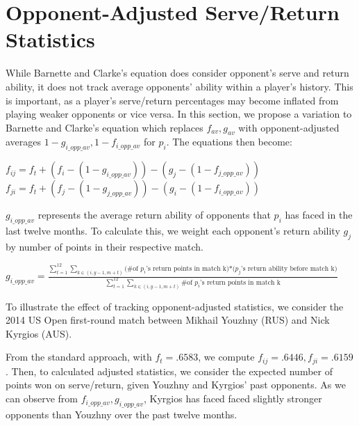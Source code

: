 \documentclass[chapterprefix=false]{report}
\begin{document}
\section{Opponent-Adjusted Serve/Return Statistics}

While Barnette and Clarke's equation does consider opponent's serve and return ability, it does not track average opponents' ability within a player's history. This is important, as a player's serve/return percentages may become inflated from playing weaker opponents or vice versa. In this section, we propose a variation to Barnette and Clarke's equation which replaces $f_{av},g_{av}$ with opponent-adjusted averages $1-g_{i\_opp\_av},1-f_{i\_opp\_av}$ for $p_i$. The equations then become:

\begin{center}
$f_{ij} = f_t + (f_i-(1-g_{i\_opp\_av}))-(g_j-(1-f_{j\_opp\_av}))$
$f_{ji} = f_t + (f_j-(1-g_{j\_opp\_av}))-(g_i-(1-f_{i\_opp\_av}))$
\end{center}

$g_{i\_opp\_av}$ represents the average return ability of opponents that $p_i$ has faced in the last twelve months. To calculate this, we weight each opponent's return ability $g_j$ by number of points in their respective match.

$g_{i\_opp\_av} = \frac{\sum_{t=1}^{12}\sum_{k \in (i,y-1,m+t)}{\text{(\# of $p_i$'s return points in match k)*($p_j$'s return ability before match k)}}}{\sum_{t=1}^{12}\sum_{k \in (i,y-1,m+t)}\text{\# of $p_i$'s return points in match k}}$

To illustrate the effect of tracking opponent-adjusted statistics, we consider the 2014 US Open first-round match between Mikhail Youzhny (RUS) and Nick Kyrgios  (AUS).


From the standard approach, with $f_t =.6583$, we compute $f_{ij} = .6446, f_{ji} = .6159$. Then, to calculated adjusted statistics, we consider the expected number of points won on serve/return, given Youzhny and Kyrgios' past opponents. As we can observe from $f_{i\_opp\_av},g_{i\_opp\_av}$, Kyrgios has faced faced slightly stronger opponents than Youzhny over the past twelve months.
\end{document}
